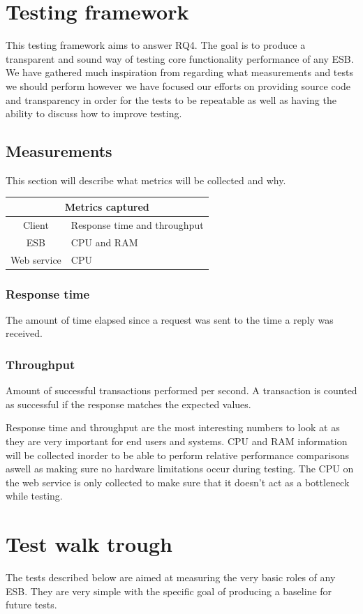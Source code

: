 \section{Testing framework}
This testing framework aims to answer RQ4. The goal is to produce a transparent and sound way of testing core functionality \cite{lit review} performance of any ESB. 
We have gathered much inspiration from \cite{Sanyanj} regarding what measurements and tests we should perform however we have focused our efforts on providing source code and transparency in order for the tests to be repeatable as well as having the ability to discuss how to improve testing.

\subsection{Measurements}
This section will describe what metrics will be collected and why.

\begin{tabular}{| c | l |}
	\hline
	\multicolumn{2}{|c|}{Metrics captured} \\
	\hline
	Client & Response time and throughput \\ \hline
	ESB & CPU and RAM \\ \hline
	Web service &  CPU \\ \hline
\end{tabular}
\subsubsection{Response time}
The amount of time elapsed since a request was sent to the time a reply was received.
\subsubsection{Throughput}
Amount of successful transactions performed per second. A transaction is counted as successful if the response matches the expected values.


Response time and throughput are the most interesting numbers to look at as they are very important for end users and systems. CPU and RAM information will be collected inorder to be able to perform relative performance comparisons aswell as making sure no hardware limitations occur during testing. The CPU on the web service is only collected to make sure that it doesn't act as a bottleneck while testing. 

\section{Test walk trough}
The tests described below are aimed at measuring the very basic roles of any ESB. They are very simple with the specific goal of producing a baseline for future tests.

